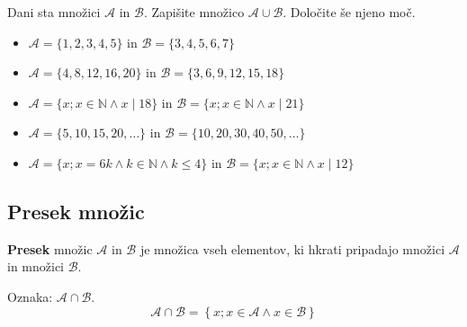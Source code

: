                     \begin{naloga}
                        Dani sta množici $\mathcal{A}$ in $\mathcal{B}$. Zapišite množico $\mathcal{A}\cup\mathcal{B}$.
                        Določite še njeno moč.
                        \begin{itemize}
                            \item $\mathcal{A}=\{1,2,3,4,5\}$ in $\mathcal{B}=\{3,4,5,6,7\}$
                            \item $\mathcal{A}=\{4,8,12,16,20\}$ in $\mathcal{B}=\{3,6,9,12,15,18\}$
                            \item $\mathcal{A}=\{x; x\in\mathbb{N} \land x\mid 18\}$ in $\mathcal{B}=\{x; x\in\mathbb{N} \land x\mid 21\}$
                            \item $\mathcal{A}=\{5,10,15,20,\dots\}$ in $\mathcal{B}=\{10, 20, 30, 40, 50, \dots\}$
                            \item $\mathcal{A}=\{x; x=6k \land k\in\mathbb{N} \land k\leq 4\}$ in $\mathcal{B}=\{x; x\in\mathbb{N} \land x\mid 12\}$
                        \end{itemize}
                    \end{naloga}
            




    \subsection{Presek množic}
                \textbf{Presek} množic $\mathcal{A}$ in $\mathcal{B}$ je množica vseh elementov, ki hkrati 
                pripadajo množici $\mathcal{A}$ in množici $\mathcal{B}$.

                Oznaka: $\mathbf{\mathcal{A}\cap\mathcal{B}}$.
                $$ \mathcal{A}\cap\mathcal{B}=\left\{x; x\in\mathcal{A}\land x\in\mathcal{B}\right\} $$
            

